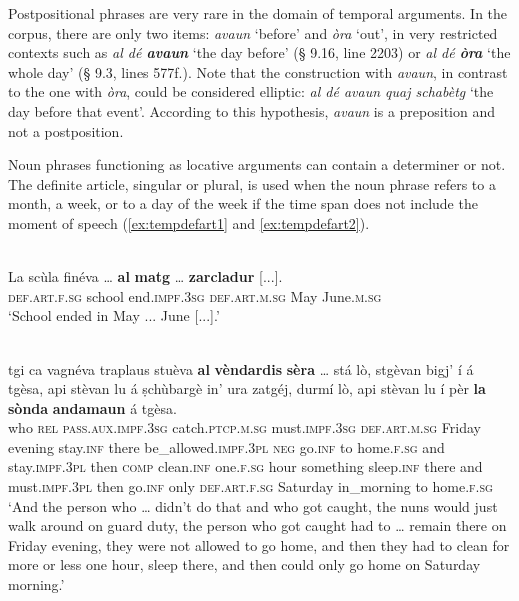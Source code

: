 Postpositional phrases are very rare in the domain of temporal arguments. In the corpus, there are only two items: \textit{avaun} `before' and \textit{òra} `out', in very restricted contexts such as \textit{al dé \textbf{avaun}} `the day before' (§ 9.16, line 2203) or \textit{al dé \textbf{òra}} `the whole day' (§ 9.3, lines 577f.). Note that the construction with \textit{avaun}, in contrast to the one with \textit{òra}, could be considered elliptic: \textit{al dé avaun quaj schabètg} `the day before that event'. According to this hypothesis, \textit{avaun} is a preposition and not a postposition.

Noun phrases functioning as locative arguments can contain a determiner or not. The definite article, singular or plural, is used when the noun phrase refers to a month, a week, or to a day of the week if the time span does not include the moment of speech (\ref{ex:tempdefart1} and \ref{ex:tempdefart2}).

\ea
\label{ex:tempdefart1}
\\
\gll  La scùla finéva … \textbf{al} \textbf{matg} … \textbf{zarcladur} [...].  \\
\textsc{def.art.f.sg} school end.\textsc{impf.3sg} {} \textsc{def.art.m.sg} May {} June.\textsc{m.sg}\\
\glt `School ended in May ... June [...].'
\z

\ea
\label{ex:tempdefart2}
\\
\gll    [...] tgi ca vagnéva traplaus stuèva \textbf{al} \textbf{vèndardis} \textbf{sèra} … stá lò, stgèvan bigj’ í á tgèsa, api stèvan lu á ṣchùbargè in’ ura zatgéj, durmí lò, api stèvan lu í pèr \textbf{la} \textbf{sònda} \textbf{andamaun} á tgèsa.\\
{} who \textsc{rel} \textsc{pass.aux.impf.3sg} catch.\textsc{ptcp.m.sg} must.\textsc{impf.3sg} \textsc{def.art.m.sg} Friday evening {} stay.\textsc{inf} there be\_allowed.\textsc{impf.3pl} \textsc{neg} go.\textsc{inf} to home.\textsc{f.sg} and stay.\textsc{impf.3pl} then \textsc{comp} clean.\textsc{inf} one.\textsc{f.sg} hour something sleep.\textsc{inf} there and must.\textsc{impf.3pl} then go.\textsc{inf} only \textsc{def.art.f.sg} Saturday in\_morning to home.\textsc{f.sg}\\
\glt `And the person who … didn’t do that and who got caught, the nuns would just walk around on guard duty, the person who got caught had to … remain there on Friday evening, they were not allowed to go home, and then they had to clean for more or less one hour, sleep there, and then could only go home on Saturday morning.'
\z

